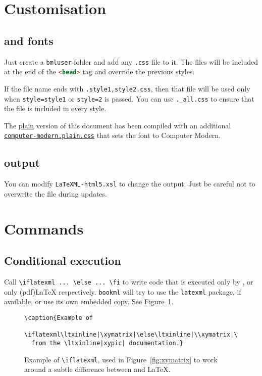 \documentclass[a4paper,british]{article}
\def\ltxinline{\lstinline[style=bookml]}
\def\htmlinline{\lstinline[language=html]}
\begin{document}
\section{Customisation}

\subsection{\CSS{} and fonts}
Just create a \lstinline|bmluser| folder and add any \lstinline|.css| file to it. The files will be included at the end of the \htmlinline|<head>| tag and override the previous styles.

If the file name ends with \lstinline|.style1,style2.css|, then that file will be used only when \lstinline|style=style1| or \lstinline|style=2| is passed. You can use \lstinline|._all.css| to ensure that the file is included in every style.

The \href{https://vlmantova.github.io/bookml/index.plain.html}{plain} version of this document has been compiled with an additional \href{https://vlmantova.github.io/bookml/bmluser/computer-modern.plain.css}{\texttt{computer-modern.plain.css}} that sets the font to Computer Modern.

\subsection{\HTML{} output}

You can modify \lstinline|LaTeXML-html5.xsl| to change the \HTML{} output. Just be careful not to overwrite the file during updates.

\section{Commands}

\subsection{Conditional execution}
Call \ltxinline|\iflatexml ... \else ... \fi| to write code that is executed only by \LaTeXML{}, or only (pdf)\LaTeX{} respectively. \lstinline|bookml| will try to use the \lstinline|latexml| package, if available, or use its own embedded copy. See Figure~\ref{fig:iflatexml}.

\begin{figure}[hb]
  \begin{lstlisting}[style=bookml]
\caption{Example of
  \iflatexml\ltxinline|\xymatrix|\else\ltxinline|\\xymatrix|\fi{}
  from the \ltxinline|xypic| documentation.}
  \end{lstlisting}
  \caption{Example of \texttt{\textbackslash{}iflatexml}, used in Figure~\ref{fig:xymatrix} to work around a subtle difference between \LaTeXML{} and \LaTeX{}.}
  \label{fig:iflatexml}
\end{figure}
\end{document}
